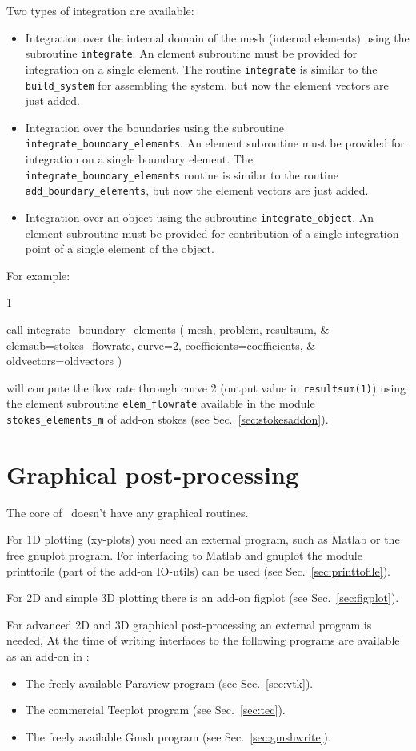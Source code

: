 Two types of integration are available:
\begin{itemize}
   \item Integration over the internal domain of the mesh 
         (internal elements) using the subroutine
         \texttt{integrate}. An element subroutine must be provided for
         integration on a single element.
         The routine \texttt{integrate} is similar to the
         \texttt{build\_system} for assembling the system, but now the element
         vectors are just added.
   \item Integration over the boundaries  using the subroutine
         \texttt{integrate\_boundary\_elements}.
         An element subroutine must be provided for integration on a single 
         boundary element.
         The \texttt{integrate\_boundary\_elements}
         routine is similar to the routine \texttt{add\_boundary\_elements},
         but now the element vectors are just added.
   \item Integration over an object using the subroutine
         \texttt{integrate\_object}.
         An element subroutine must be provided for contribution of 
         a single integration point of a single element of the object.
\end{itemize}
For example:
\begin{listing}{1}

    call integrate_boundary_elements ( mesh, problem, resultsum, &
      elemsub=stokes_flowrate, curve=2, coefficients=coefficients, &
      oldvectors=oldvectors )

\end{listing}
will compute the flow rate through curve 2
(output value in \texttt{resultsum(1)}) using the element subroutine
\texttt{elem\_flowrate} available in the module 
\texttt{stokes\_elements\_m} of add-on stokes
(see Sec.~\ref{sec:stokesaddon}).

\section{Graphical post-processing}

The core of \tfem\ doesn't have any graphical routines.

For 1D plotting
(xy-plots) you need an external program, such as Matlab or
the free gnuplot program. For interfacing to Matlab and
gnuplot the module printtofile (part of the add-on IO-utils) can be used 
(see Sec.~\ref{sec:printtofile}).

For 2D and simple 3D
plotting there is an add-on figplot (see Sec.~\ref{sec:figplot}).

For advanced 2D and 3D graphical post-processing an external program is needed,
At the time of writing interfaces to the following
programs are available as an add-on in \tfem:
\begin{itemize}
\item
The freely available Paraview program (see Sec.~\ref{sec:vtk}).
\item
The commercial Tecplot program (see Sec.~\ref{sec:tec}).
\item
The freely available Gmsh program (see Sec.~\ref{sec:gmshwrite}).
\end{itemize}

